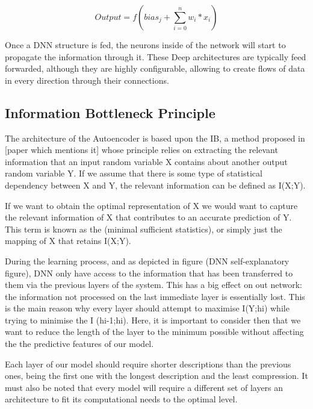 \documentclass[12pt]{report}
\begin{document}
\begin{equation}
\label{eq:artificial neuron}
Output = f( bias_j + \sum_{i = 0}^{n} w_{i}*x_i ) 
\end{equation}
\newline

Once a DNN structure is fed, the neurons inside of the network will start to propagate the information through it. These Deep architectures are typically feed forwarded, although they are highly configurable, allowing to create flows of data in every direction through their connections.\par

\subsection{Information Bottleneck Principle}

The architecture of the Autoencoder is based upon the IB, a method proposed in [paper which mentions it] whose principle relies on extracting the relevant information that an input random variable X contains about another output random variable Y. If we assume that there is some type of statistical dependency between X and Y, the relevant information can be defined as I(X;Y).\par

If we want to obtain the optimal representation of X we would want to capture the relevant information of X that contributes to an accurate prediction of Y. This term is known as the (minimal sufficient statistics), or simply just the mapping of X that retains I(X;Y).\par

During the learning process, and as depicted in figure (DNN self-explanatory figure), DNN only have access to the information that has been transferred to them via the previous layers of the system. This has a big effect on out network: the information not processed on the last immediate layer is essentially lost. This is the main reason why every layer should attempt to maximise I(Y;hi) while trying to minimise the I (hi-1;hi). Here, it is important to consider then that we want to reduce the length of the layer to the minimum possible without affecting the the predictive features of our model.

Each layer of our model should require shorter descriptions than the previous ones, being the first one with the longest description and the least compression. It must also be noted that every model will require a different set of layers an architecture to fit its computational needs to the optimal level.
\end{document}
